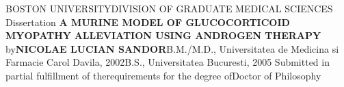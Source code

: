 \documentclass[12pt,english]{report}\usepackage[]{graphicx}\usepackage[]{color}
\begin{document}
\begin{singlespace}
\begin{center}
 BOSTON UNIVERSITY\linebreak DIVISION OF GRADUATE
MEDICAL SCIENCES\linebreak \linebreak \linebreak \linebreak \linebreak \linebreak
Dissertation \linebreak \linebreak \linebreak \linebreak \linebreak \linebreak
\textbf{A MURINE MODEL OF GLUCOCORTICOID MYOPATHY }\linebreak \linebreak\textbf{ALLEVIATION
USING ANDROGEN THERAPY}\linebreak \linebreak \linebreak \linebreak \linebreak
by\linebreak \linebreak \linebreak \linebreak \linebreak \textbf{NICOLAE
LUCIAN SANDOR}\linebreak B.M./M.D., Universitatea de Medicina si
Farmacie Carol Davila, 2002\linebreak B.S., Universitatea Bucuresti,
2005\linebreak \linebreak \linebreak \linebreak \linebreak \linebreak \linebreak \linebreak
Submitted in partial fulfillment of the\linebreak \linebreak requirements
for the degree of\linebreak \linebreak Doctor of Philosophy\linebreak {}
\par\end{center}
\end{singlespace}
\end{document}
